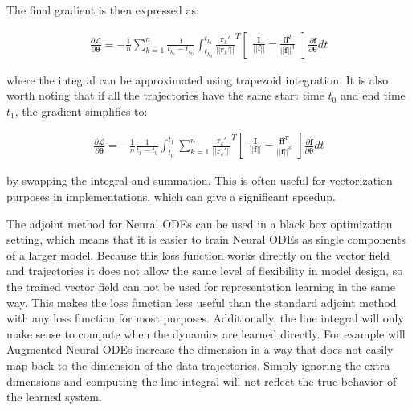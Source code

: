 \documentclass[12pt,a4paper]{book}
\begin{document}
The final gradient is then expressed as:

\begin{equation}
    \begin{aligned}
        \frac{\partial \mathcal{L}}{\partial \bm{\theta}} = - \frac{1}{n} \sum_{k=1}^{n} \frac{1}{t_{k_1} - t_{k_0}} \int_{t_{k_0}}^{t_{k_1}} \frac{\bm{r}_k'}{|| \bm{r}_k' ||}^T \begin{bmatrix} \frac{\bm{I}}{|| \bm{f} ||} - \frac{\bm{f} \bm{f}^T}{|| \bm{f} ||^3} \end{bmatrix} \frac{\partial \bm{f}}{\partial \bm{\theta}} dt
    \end{aligned}
\end{equation}

\noindent where the integral can be approximated using trapezoid integration. It is also worth noting that if all the trajectories have the same start time $t_0$ and end time $t_1$, the gradient simplifies to:

\begin{equation}
    \begin{aligned}
        \frac{\partial \mathcal{L}}{\partial \bm{\theta}} = - \frac{1}{n} \frac{1}{t_1 - t_0} \int_{t_0}^{t_1} \sum_{k=1}^{n} \frac{\bm{r}_k'}{|| \bm{r}_k' ||}^T \begin{bmatrix} \frac{\bm{I}}{|| \bm{f} ||} - \frac{\bm{f} \bm{f}^T}{|| \bm{f} ||^3} \end{bmatrix} \frac{\partial \bm{f}}{\partial \bm{\theta}} dt
    \end{aligned}
\end{equation}

\noindent by swapping the integral and summation. This is often useful for vectorization purposes in implementations, which can give a significant speedup.

The adjoint method for Neural ODEs can be used in a black box optimization setting, which means that it is easier to train Neural ODEs as single components of a larger model. Because this loss function works directly on the vector field and trajectories it does not allow the same level of flexibility in model design, so the trained vector field can not be used for representation learning in the same way. This makes the loss function less useful than the standard adjoint method with any loss function for most purposes. Additionally, the line integral will only make sense to compute when the dynamics are learned directly. For example will Augmented Neural ODEs increase the dimension in a way that does not easily map back to the dimension of the data trajectories. Simply ignoring the extra dimensions and computing the line integral will not reflect the true behavior of the learned system.
\end{document}
